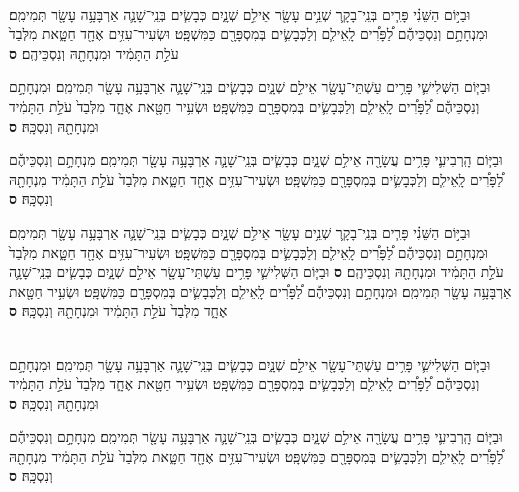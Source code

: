 \documentclass[twoside, openany, parskip=half, 11pt]{book}
\begin{document}
\begin{footnotesize}
\begin{multicols}{2}

\\
וּבַיּ֣וֹם הַשֵּׁנִ֗י פָּרִ֧ים בְּנֵֽי־בָקָ֛ר שְׁנֵ֥ים עָשָׂ֖ר אֵילִ֣ם שְׁנָ֑יִם כְּבָשִׂ֧ים בְּנֵֽי־שָׁנָ֛ה אַרְבָּעָ֥ה עָשָׂ֖ר תְּמִימִֽם׃ וּמִנְחָתָ֣ם וְנִסְכֵּיהֶ֡ם לַ֠פָּרִ֠ים לָֽאֵילִ֧ם וְלַכְּבָשִׂ֛ים בְּמִסְפָּרָ֖ם כַּמִּשְׁפָּֽט׃ וּשְׂעִיר־עִזִּ֥ים אֶחָ֖ד חַטָּ֑את מִלְּבַד֙ עֹלַ֣ת הַתָּמִ֔יד וּמִנְחָתָ֖הּ וְנִסְכֵּיהֶֽם׃ \textbf{ס}  

וּבַיּ֧וֹם הַשְּׁלִישִׁ֛י פָּרִ֥ים עַשְׁתֵּי־עָשָׂ֖ר אֵילִ֣ם שְׁנָ֑יִם כְּבָשִׂ֧ים בְּנֵֽי־שָׁנָ֛ה אַרְבָּעָ֥ה עָשָׂ֖ר תְּמִימִֽם׃ וּמִנְחָתָ֣ם וְנִסְכֵּיהֶ֡ם לַ֠פָּרִ֠ים לָֽאֵילִ֧ם וְלַכְּבָשִׂ֛ים בְּמִסְפָּרָ֖ם כַּמִּשְׁפָּֽט׃ וּשְׂעִ֥יר חַטָּ֖את אֶחָ֑ד מִלְּבַד֙ עֹלַ֣ת הַתָּמִ֔יד וּמִנְחָתָ֖הּ וְנִסְכָּֽהּ׃ \textbf{ס} 

וּבַיּ֧וֹם הָֽרְבִיעִ֛י פָּרִ֥ים עֲשָׂרָ֖ה אֵילִ֣ם שְׁנָ֑יִם כְּבָשִׂ֧ים בְּנֵֽי־שָׁנָ֛ה אַרְבָּעָ֥ה עָשָׂ֖ר תְּמִימִֽם׃ מִנְחָתָ֣ם וְנִסְכֵּיהֶ֡ם לַ֠פָּרִ֠ים לָֽאֵילִ֧ם וְלַכְּבָשִׂ֛ים בְּמִסְפָּרָ֖ם כַּמִּשְׁפָּֽט׃ וּשְׂעִיר־עִזִּ֥ים אֶחָ֖ד חַטָּ֑את מִלְּבַד֙ עֹלַ֣ת הַתָּמִ֔יד מִנְחָתָ֖הּ וְנִסְכָּֽהּ׃ \textbf{ס} 

וּבַיּ֣וֹם הַשֵּׁנִ֗י פָּרִ֧ים בְּנֵֽי־בָקָ֛ר שְׁנֵ֥ים עָשָׂ֖ר אֵילִ֣ם שְׁנָ֑יִם כְּבָשִׂ֧ים בְּנֵֽי־שָׁנָ֛ה אַרְבָּעָ֥ה עָשָׂ֖ר תְּמִימִֽם׃ וּמִנְחָתָ֣ם וְנִסְכֵּיהֶ֡ם לַ֠פָּרִ֠ים לָֽאֵילִ֧ם וְלַכְּבָשִׂ֛ים בְּמִסְפָּרָ֖ם כַּמִּשְׁפָּֽט׃ וּשְׂעִיר־עִזִּ֥ים אֶחָ֖ד חַטָּ֑את מִלְּבַד֙ עֹלַ֣ת הַתָּמִ֔יד וּמִנְחָתָ֖הּ וְנִסְכֵּיהֶֽם׃ \textbf{ס}  
וּבַיּ֧וֹם הַשְּׁלִישִׁ֛י פָּרִ֥ים עַשְׁתֵּי־עָשָׂ֖ר אֵילִ֣ם שְׁנָ֑יִם כְּבָשִׂ֧ים בְּנֵֽי־שָׁנָ֛ה אַרְבָּעָ֥ה עָשָׂ֖ר תְּמִימִֽם׃ וּמִנְחָתָ֣ם וְנִסְכֵּיהֶ֡ם לַ֠פָּרִ֠ים לָֽאֵילִ֧ם וְלַכְּבָשִׂ֛ים בְּמִסְפָּרָ֖ם כַּמִּשְׁפָּֽט׃ וּשְׂעִ֥יר חַטָּ֖את אֶחָ֑ד מִלְּבַד֙ עֹלַ֣ת הַתָּמִ֔יד וּמִנְחָתָ֖הּ וְנִסְכָּֽהּ׃ \textbf{ס} 

\\
וּבַיּ֧וֹם הַשְּׁלִישִׁ֛י פָּרִ֥ים עַשְׁתֵּי־עָשָׂ֖ר אֵילִ֣ם שְׁנָ֑יִם כְּבָשִׂ֧ים בְּנֵֽי־שָׁנָ֛ה אַרְבָּעָ֥ה עָשָׂ֖ר תְּמִימִֽם׃ וּמִנְחָתָ֣ם וְנִסְכֵּיהֶ֡ם לַ֠פָּרִ֠ים לָֽאֵילִ֧ם וְלַכְּבָשִׂ֛ים בְּמִסְפָּרָ֖ם כַּמִּשְׁפָּֽט׃ וּשְׂעִ֥יר חַטָּ֖את אֶחָ֑ד מִלְּבַד֙ עֹלַ֣ת הַתָּמִ֔יד וּמִנְחָתָ֖הּ וְנִסְכָּֽהּ׃ \textbf{ס} 

וּבַיּ֧וֹם הָֽרְבִיעִ֛י פָּרִ֥ים עֲשָׂרָ֖ה אֵילִ֣ם שְׁנָ֑יִם כְּבָשִׂ֧ים בְּנֵֽי־שָׁנָ֛ה אַרְבָּעָ֥ה עָשָׂ֖ר תְּמִימִֽם׃ מִנְחָתָ֣ם וְנִסְכֵּיהֶ֡ם לַ֠פָּרִ֠ים לָֽאֵילִ֧ם וְלַכְּבָשִׂ֛ים בְּמִסְפָּרָ֖ם כַּמִּשְׁפָּֽט׃ וּשְׂעִיר־עִזִּ֥ים אֶחָ֖ד חַטָּ֑את מִלְּבַד֙ עֹלַ֣ת הַתָּמִ֔יד מִנְחָתָ֖הּ וְנִסְכָּֽהּ׃ \textbf{ס} 


\end{multicols}
\end{footnotesize}
\end{document}
